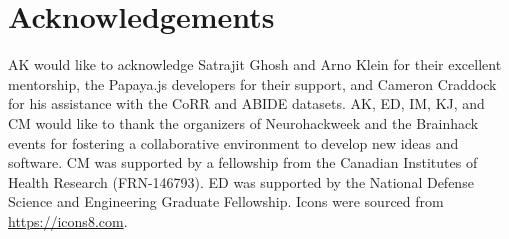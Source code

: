 \section{Acknowledgements}
AK would like to acknowledge Satrajit Ghosh and Arno Klein for their excellent mentorship, the Papaya.js developers for their support, and Cameron Craddock for his assistance with the CoRR and ABIDE datasets. AK, ED, IM, KJ, and CM would like to thank the organizers of Neurohackweek and the Brainhack events for fostering a collaborative environment to develop new ideas and software. CM was supported by a fellowship from the Canadian Institutes of Health Research (FRN-146793).  ED was supported by the National Defense Science and Engineering Graduate Fellowship. Icons were sourced from \href{https://icons8.com}{https://icons8.com}.

